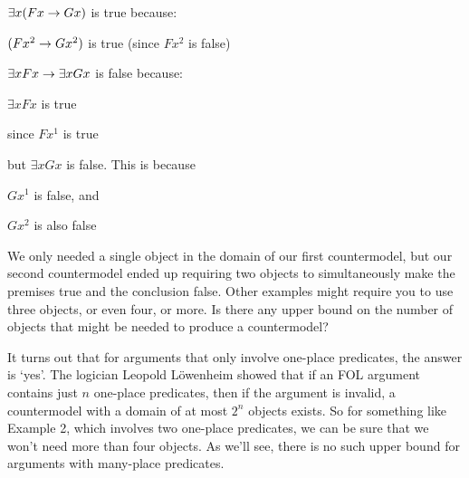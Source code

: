 \begin{ebullet}
\item $\exists x(Fx \rightarrow Gx)$ is true because:
\begin{etriangle}
\item $(Fx^2 \rightarrow Gx^2)$ is true (since $Fx^2$ is false)
\end{etriangle}
\end{ebullet}

\begin{ebullet}
\item $\exists xFx \rightarrow \exists x Gx$ is false because:
\begin{etriangle}
\item $\exists xFx$ is true
\begin{etriangle}
\item since $Fx^1$ is true
\end{etriangle}
\item but $\exists xGx$ is false.  This is because
\begin{etriangle}
\item $Gx^1$ is false, and
\item $Gx^2$ is also false
\end{etriangle}
\end{etriangle}
\end{ebullet}


We only needed a single object in the domain of our first countermodel, but our second countermodel ended up requiring two objects to simultaneously make the premises true and the conclusion false.  Other examples might require you to use three objects, or even four, or more.  Is there any upper bound on the number of objects that might be needed to produce a countermodel?

It turns out that for arguments that only involve one-place predicates, the answer is `yes'.  The logician Leopold L\"owenheim showed that if an FOL argument contains just $n$ one-place predicates, then if the argument is invalid, a countermodel with a domain of at most $2^n$ objects exists.  So for something like Example 2, which involves two one-place predicates, we can be sure that we won't need more than four objects.  As we'll see, there is no such upper bound for arguments with many-place predicates.


